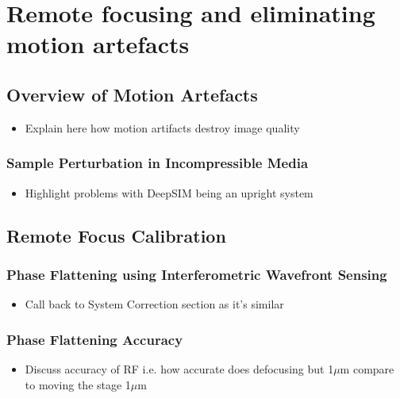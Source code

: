 \chapter{Remote focusing and eliminating motion artefacts}

\section{Overview of Motion Artefacts}
\label{sec:motion_artifacts}

\begin{itemize}
	\item Explain here how motion artifacts destroy image quality
\end{itemize}

	\subsection{Sample Perturbation in Incompressible Media}
	\label{subsec:sample_perturbation}
	
	\begin{itemize}
		\item Highlight problems with DeepSIM being an upright system
	\end{itemize}

\section{Remote Focus Calibration}
\label{sec:remote_focus_calibration}

	\subsection{Phase Flattening using Interferometric Wavefront Sensing}
	\label{subsec:phase_flattening}
	
	\begin{itemize}
		\item Call back to System Correction section as it's similar
	\end{itemize}

	\subsection{Phase Flattening Accuracy}
	\label{subsec:phase_flattening_accuracy}
	
	\begin{itemize}
		\item Discuss accuracy of RF i.e. how accurate does defocusing but 1$\mu$m compare to moving the stage 1$\mu$m
	\end{itemize}

